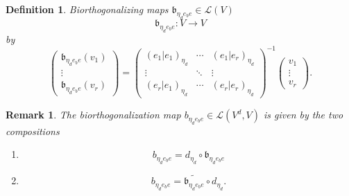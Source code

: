 \documentclass[aps,preprint]{revtex4}
\newtheorem{definition}[theorem]{Definition}
\newtheorem{remark}[theorem]{Remark}
\begin{document}
\begin{definition}
Biorthogonalizing maps $\mathfrak{b}_{\eta _{d}e_{b}e}\in \mathcal{L}\left(
V\right) $%
\begin{equation}
\mathfrak{b}_{\eta _{d}e_{b}e}:V\rightarrow V
\end{equation}%
by%
\begin{equation}
\left( 
\begin{array}{c}
\mathfrak{b}_{\eta _{d}e_{b}e}\left( \overset{}{v_{1}}\right) \\ 
\vdots \\ 
\mathfrak{b}_{\eta _{d}e_{b}e}\left( \overset{}{v_{r}}\right)%
\end{array}%
\right) =\left( 
\begin{array}{ccc}
\left( \left. e_{1}\right\vert e_{1}\right) _{\eta _{d}} & \cdots & \left(
\left. e_{1}\right\vert e_{r}\right) _{\eta _{d}} \\ 
\vdots & \ddots & \vdots \\ 
\left( \left. e_{r}\right\vert e_{1}\right) _{\eta _{d}} & \cdots & \left(
\left. e_{r}\right\vert e_{r}\right) _{\eta _{d}}%
\end{array}%
\right) ^{-1}\left( 
\begin{array}{c}
v_{1} \\ 
\vdots \\ 
v_{r}%
\end{array}%
\right) .
\end{equation}
\end{definition}

\begin{remark}
The biorthogonalization map $b_{\eta _{d}e_{b}e}\in \mathcal{L}\left(
V^{d},V\right) $ is given by the two compositions

\begin{enumerate}
\item 
\begin{equation}
b_{\eta _{d}e_{b}e}=d_{\eta _{d}}\circ \mathfrak{b}_{\eta _{d}e_{b}e}
\end{equation}

\item 
\begin{equation}
b_{\eta _{d}e_{b}e}=\widetilde{\mathfrak{b}_{\eta _{d}e_{b}e}}\circ d_{\eta
_{d}}.
\end{equation}
\end{enumerate}
\end{remark}
\end{document}
